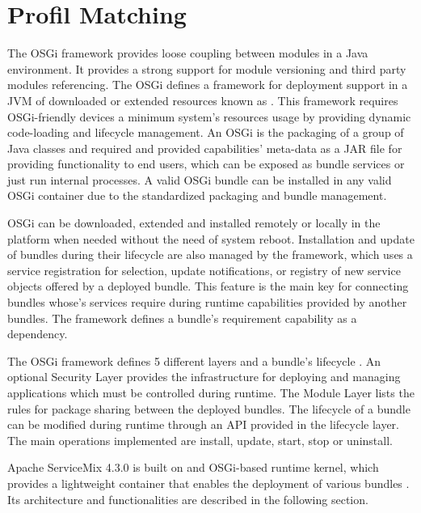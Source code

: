 \section{Profil Matching}
\label{sec:ProfilMatching}

The \ac{OSGi} framework provides loose coupling between modules in a Java environment. It provides a strong support for module versioning and third party modules referencing. The \ac{OSGi} defines a framework for deployment support in a \ac{JVM} of downloaded or extended resources known as . This framework requires OSGi-friendly devices a minimum system's resources usage by providing dynamic code-loading and  lifecycle management. An \ac{OSGi}  is the packaging of a group of Java classes and required and provided capabilities' meta-data as a JAR file for providing functionality to end users, which can be exposed as bundle services or just run internal processes. A valid \ac{OSGi} bundle can be installed in any valid \ac{OSGi} container due to the standardized packaging and bundle management. 

\ac{OSGi}  can be downloaded, extended and installed remotely or locally in the platform when needed without the need of system reboot. Installation and update of bundles during their lifecycle are also managed by the framework, which uses a service registration for selection, update notifications, or registry of new service objects offered by a deployed bundle. This feature is the main key for connecting bundles whose's services require during runtime capabilities provided by another bundles. The framework defines a bundle's requirement capability as a dependency.      

The \ac{OSGi} framework defines 5 different layers and a bundle's lifecycle \cite{OSGi2011}. An optional Security Layer provides the infrastructure for deploying and managing applications which must be controlled during runtime. The Module Layer lists the rules for package sharing between the deployed bundles. The lifecycle of a bundle can be modified during runtime through an API provided in the lifecycle layer. The main operations implemented are install, update, start, stop or uninstall. 

Apache ServiceMix 4.3.0 is built on and \ac{OSGi}-based runtime kernel, which provides a lightweight container that enables the deployment of various bundles \cite{openesbaction}. Its architecture and functionalities are described in the following section. 
